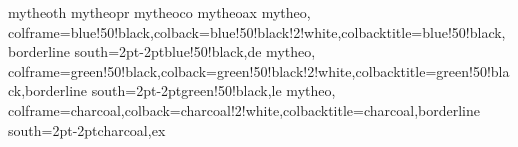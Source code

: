 %
{mytheo}{th}
\newcommand{\thref}[1]{{\bfseries\sffamily Theorem \ref{th:#1}}}
%
{mytheo}{pr}
\newcommand{\prref}[1]{{\bfseries\sffamily Proposition \ref{pr:#1}}}
%
{mytheo}{co}
\newcommand{\coref}[1]{{\bfseries\sffamily Corollary \ref{co:#1}}}
%
{mytheo}{ax}
\newcommand{\axref}[1]{{\bfseries\sffamily Axiom \ref{ax:#1}}}
%
{mytheo,
colframe=blue!50!black,colback=blue!50!black!2!white,colbacktitle=blue!50!black,borderline south={2pt}{-2pt}{blue!50!black},}{de}
\newcommand{\deref}[1]{{\bfseries\sffamily Definition \ref{de:#1}}}
%
{mytheo,
colframe=green!50!black,colback=green!50!black!2!white,colbacktitle=green!50!black,borderline south={2pt}{-2pt}{green!50!black},}{le}
\newcommand{\leref}[1]{{\bfseries\sffamily Lemma \ref{le:#1}}}
%
{mytheo,
colframe=charcoal,colback=charcoal!2!white,colbacktitle=charcoal,borderline south={2pt}{-2pt}{charcoal},}{ex}
\newcommand{\exref}[1]{{\bfseries\sffamily Example \ref{ex:#1}}}

